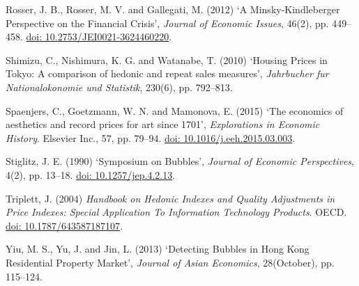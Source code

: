 \documentclass[12pt,]{article}
\begin{document}
Rosser, J. B., Rosser, M. V. and Gallegati, M. (2012) `A
Minsky-Kindleberger Perspective on the Financial Crisis', \emph{Journal
of Economic Issues}, 46(2), pp. 449--458.
\href{http://doi.org/10.2753/JEI0021-3624460220}{doi: 10.2753/JEI0021-3624460220}.

Shimizu, C., Nishimura, K. G. and Watanabe, T. (2010) `Housing Prices in
Tokyo: A comparison of hedonic and repeat sales measures',
\emph{Jahrbucher fur Nationalokonomie und Statistik}, 230(6), pp.
792--813.

Spaenjers, C., Goetzmann, W. N. and Mamonova, E. (2015) `The economics
of aesthetics and record prices for art since 1701', \emph{Explorations
in Economic History}. Elsevier Inc., 57, pp. 79--94.
\href{http://doi.org/10.1016/j.eeh.2015.03.003}{doi: 10.1016/j.eeh.2015.03.003}.

Stiglitz, J. E. (1990) `Symposium on Bubbles', \emph{Journal of Economic
Perspectives}, 4(2), pp. 13--18.
\href{http://doi.org/10.1257/jep.4.2.13}{doi: 10.1257/jep.4.2.13}.

Triplett, J. (2004) \emph{Handbook on Hedonic Indexes and Quality
Adjustments in Price Indexes: Special Application To Information
Technology Products}. OECD.
\href{http://doi.org/10.1787/643587187107}{doi: 10.1787/643587187107}.

Yiu, M. S., Yu, J. and Jin, L. (2013) `Detecting Bubbles in Hong Kong
Residential Property Market', \emph{Journal of Asian Economics},
28(October), pp. 115--124.
\end{document}
